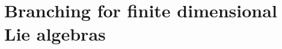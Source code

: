 \documentclass[12pt]{iopart}
\theoremstyle{definition}
\theoremstyle{definition}
\theoremstyle{definition}
\theoremstyle{definition}
\begin{document}
\section{Branching for finite dimensional Lie algebras}
\label{sec:finite-dimens-lie}
\end{document}
